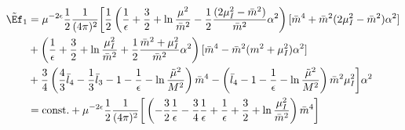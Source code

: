 \documentclass{article}
\begin{document}
\begin{align}
    \tilde \Ef_1
    & = 
    \mu^{-2\epsilon} \frac{1}{2} \frac{1}{(4\pi)^2}
    \bigg[
        \frac{1}{2}
        \left(
            \frac{1}{\epsilon} + \frac{3}{2} +\ln \frac{\mu^2}{\bar m^2} - \frac{1}{2} \frac{(2\mu_I^2 - \bar m^2)}{\bar m^2}\alpha^2
        \right)[\bar m^4 + \bar m^2 (2\mu_I^2 - \bar m^2)\alpha^2]
        \\
        & +
        \left(
            \frac{1}{\epsilon} + \frac{3}{2} +\ln \frac{\mu_I^2}{\bar m^2} + \frac{1}{2}\frac{\bar m^2 + \mu_I^2}{\bar m^2}\alpha^2
        \right)[\bar m^4 - \bar m^2(m^2 + \mu_I^2) \alpha^2]
        \\
        &
        +
        \frac{3}{4}
        \left(
            \frac{4}{3}\bar l_4 - \frac{1}{3}\bar l_3 - 1 - \frac{1}{\epsilon} 
            - \ln\frac{\tilde \mu^2}{M^2}
        \right)\bar m^4
        -
        \left(
            \bar l_4 - 1 - \frac{1}{\epsilon} - \ln\frac{\tilde \mu^2}{M^2}
        \right) 
        \bar m^2\mu_I^2
    \bigg] \alpha^2
    \\
    &=
    \mathrm{const.}
    +
    \mu^{-2\epsilon}\frac{1}{2} \frac{1}{(4\pi)^2}
    \bigg[
        \left(
            -\frac{3}{2}\frac{1}{\epsilon} - \frac{3}{4}\frac{1}{\epsilon} + \frac{1}{\epsilon}
            + \frac{3}{2} + \ln \frac{\mu_I^2}{\bar m^2} 
        \right)
        \bar m^4
    \bigg]
\end{align}
\end{document}
